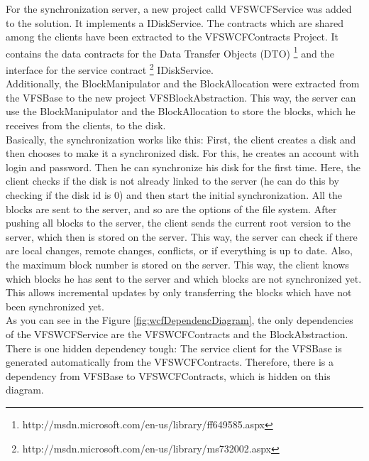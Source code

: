 \documentclass[JCDReport.tex]{subfiles}
\begin{document}

For the synchronization server, a new project calld VFSWCFService was added to the solution. It implements a IDiskService. The contracts which are shared among the clients have been extracted to the VFSWCFContracts Project. It contains the data contracts for the Data Transfer Objects (DTO) \footnote{http://msdn.microsoft.com/en-us/library/ff649585.aspx} and the interface for the service contract \footnote{http://msdn.microsoft.com/en-us/library/ms732002.aspx} IDiskService.\\

Additionally, the BlockManipulator and the BlockAllocation were extracted from the VFSBase to the new project VFSBlockAbstraction. This way, the server can use the BlockManipulator and the BlockAllocation to store the blocks, which he receives from the clients, to the disk.\\

Basically, the synchronization works like this: First, the client creates a disk and then chooses to make it a synchronized disk. For this, he creates an account with login and password. Then he can synchronize his disk for the first time. Here, the client checks if the disk is not already linked to the server (he can do this by checking if the disk id is 0) and then start the initial synchronization. All the blocks are sent to the server, and so are the options of the file system. After pushing all blocks to the server, the client sends the current root version to the server, which then is stored on the server. This way, the server can check if there are local changes, remote changes, conflicts, or if everything is up to date. Also, the maximum block number is stored on the server. This way, the client knows which blocks he has sent to the server and which blocks are not synchronized yet. This allows incremental updates by only transferring the blocks which have not been synchronized yet.\\

As you can see in the Figure \ref{fig:wcfDependencDiagram}, the only dependencies of the VFSWCFService are the VFSWCFContracts and the BlockAbstraction. There is one hidden dependency tough: The service client for the VFSBase is generated automatically from the VFSWCFContracts. Therefore, there is a dependency from VFSBase to VFSWCFContracts, which is hidden on this diagram.\\
\end{document}
